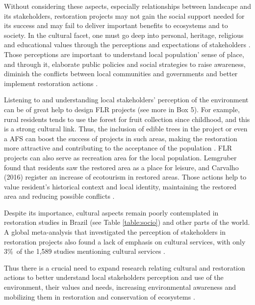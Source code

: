 Without considering these aspects, especially relationships between landscape and its stakeholders, restoration projects may not gain the social support needed for its success and may fail to deliver important benefits to ecosystems and to society. In the cultural facet, one must go deep into personal, heritage, religious and educational values through the perceptions and expectations of stakeholders \citep{Brancalion2014CulturalForest}. Those perceptions are important to understand local population' sense of place, and through it, elaborate public policies and social strategies to raise awareness, diminish the conflicts between local communities and governments and better implement restoration actions \citep{Ribeiro2009, Costa2013}.

Listening to and understanding local stakeholders' perception of the environment can be of great help to design FLR projects (see more in Box 5). For example, rural residents tends to use the forest for fruit collection since childhood, and this is a strong cultural link. Thus, the inclusion of edible trees in the project or even a AFS can boost the success of projects in such areas, making the  restoration more attractive and contributing to the acceptance of the population \citep{Muler}. FLR projects can also serve as recreation area for the local population. Lemgruber \cite{Lemgruber2017Luisa2017} found that residents saw the restored area as a place for leisure, and Carvalho (2016) register an increase of ecotourism in restored areas. Those actions help to value resident's historical context and local identity, maintaining the restored area and reducing possible conflicts \citep{Moom-SchultS.IFreitasSRPassarelli2014,Miranda2017}.

Despite its importance, cultural aspects remain poorly contemplated in restoration studies in Brazil (see Table \ref{table:socio}) and other parts of the world. A global meta-analysis that investigated the perception of stakeholders in restoration projects also found a lack of emphasis on cultural services, with only 3\%\ of the 1,589 studies mentioning cultural services \citep{Aronson2010}. 


Thus there is a crucial need to expand research relating cultural and restoration actions to better understand local stakeholders perception and use of the environment, their values and needs, increasing environmental awareness and mobilizing them in restoration and conservation of ecosystems \citep{Menzel2010, Lamarque2011, IIS2017EstudoPaulista}.

